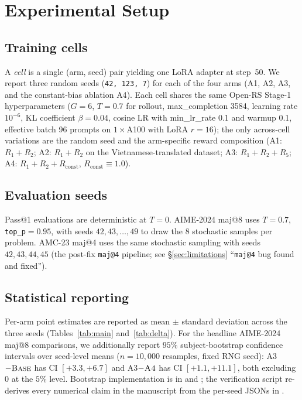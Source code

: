 \documentclass[journal,onecolumn,11pt]{IEEEtran}
\newcommand{\armA}{\textsc{A1}}
\newcommand{\armB}{\textsc{A2}}
\newcommand{\armC}{\textsc{A3}}
\newcommand{\armD}{\textsc{A4}}
\newcommand{\base}{\textsc{Base}}
\begin{document}
\section{Experimental Setup}
\label{sec:setup}

\subsection{Training cells}
A \emph{cell} is a single (arm, seed) pair yielding one LoRA adapter at
step~50. We report three random seeds (\texttt{42, 123, 7}) for each of
the four arms (\armA{}, \armB{}, \armC{}, and the constant-bias ablation
\armD{}). Each cell shares the same Open-RS Stage-1 hyperparameters
($G{=}6$, $T{=}0.7$ for rollout, max\_completion 3584, learning rate
$10^{-6}$, KL coefficient $\beta{=}0.04$, cosine LR with min\_lr\_rate
0.1 and warmup 0.1, effective batch 96 prompts on $1\times$A100 with LoRA
$r{=}16$); the only across-cell variations are the random seed and the
arm-specific reward composition (\armA{}: $R_1{+}R_2$; \armB{}: $R_1{+}R_2$
on the Vietnamese-translated dataset; \armC{}: $R_1{+}R_2{+}R_5$;
\armD{}: $R_1{+}R_2{+}R_{\text{const}}$, $R_{\text{const}}{\equiv}1.0$).

\subsection{Evaluation seeds}
Pass@1 evaluations are deterministic at $T{=}0$. AIME-2024 maj@8 uses
$T{=}0.7$, \texttt{top\_p}$=0.95$, with seeds $42,43,\ldots,49$ to draw the
8 stochastic samples per problem. AMC-23 maj@4 uses the same stochastic
sampling with seeds $42,43,44,45$ (the post-fix \texttt{maj@4} pipeline; see
\S\ref{sec:limitations} ``\texttt{maj@4} bug found and fixed'').

\subsection{Statistical reporting}
Per-arm point estimates are reported as mean $\pm$ standard deviation
across the three seeds (Tables~\ref{tab:main} and~\ref{tab:delta}).
For the headline AIME-2024 maj@8 comparisons, we additionally report
$95\%$ subject-bootstrap confidence intervals over seed-level means
($n{=}10{,}000$ resamples, fixed RNG seed): \armC{}$-\base{}$ has
CI $[+3.3, +6.7]$ and \armC{}$-\armD{}$ has CI $[+1.1, +11.1]$, both
excluding $0$ at the $5\%$ level. Bootstrap implementation is in
 and ;
the verification script re-derives every numerical claim in the manuscript
from the per-seed JSONs in .
\end{document}
